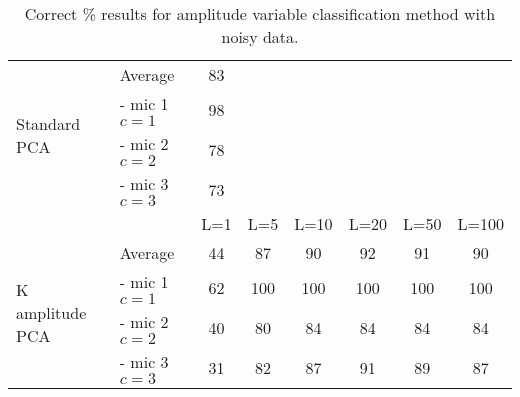 \begin{table}[t]\begin{center}
\caption{Correct \% results for amplitude variable classification method with noisy data.}
\label{tab:KAPRresultsNoisy}
\begin{tabular}{|l|l|c|c|c|c|c|c|}\cline{1-3}
\multirow{4}{*}{Standard PCA}   & Average           & 83        & \multicolumn{5}{c}{ } \\ \cline{2-3}
                                & - mic 1 $c = 1$   & 98        & \multicolumn{5}{c}{ } \\
                                & - mic 2 $c = 2$   & 78        & \multicolumn{5}{c}{ } \\
                                & - mic 3 $c = 3$   & 73        & \multicolumn{5}{c}{ } \\ \hline
                                &                   & L=1       & L=5   & L=10  & L=20  & L=50  & L=100 \\ \hline
\multirow{4}{*}{K amplitude PCA}& Average           & 44        & 87    & 90    & 92    & 91    & 90    \\ \cline{2-8}
                                & - mic 1 $c = 1$   & 62        & 100   & 100   & 100   & 100   & 100   \\
                                & - mic 2 $c = 2$   & 40        & 80    & 84    & 84    & 84    & 84    \\
                                & - mic 3 $c = 3$   & 31        & 82    & 87    & 91    & 89    & 87    \\ \hline
\end{tabular}\end{center}\end{table}


